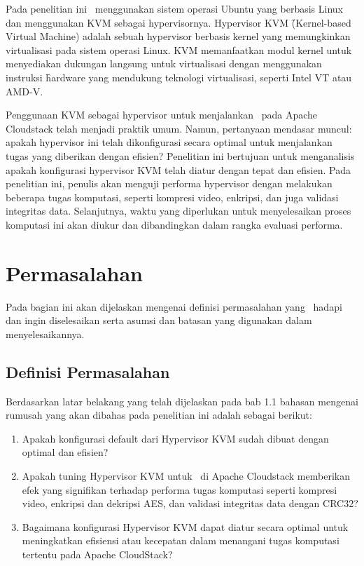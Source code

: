 Pada penelitian ini \saya\ menggunakan sistem operasi Ubuntu yang berbasis Linux dan menggunakan KVM sebagai hypervisornya. Hypervisor KVM \f{(Kernel-based Virtual Machine)} adalah sebuah hypervisor berbasis kernel yang memungkinkan virtualisasi pada sistem operasi Linux\cite{whatiskvm}. KVM memanfaatkan modul kernel untuk menyediakan dukungan langsung untuk virtualisasi dengan menggunakan instruksi \f{hardware} yang mendukung teknologi virtualisasi, seperti Intel VT atau AMD-V.

Penggunaan KVM sebagai hypervisor untuk menjalankan \vm\ pada Apache Cloudstack telah menjadi praktik umum. Namun, pertanyaan mendasar muncul: apakah hypervisor ini telah dikonfigurasi secara optimal untuk menjalankan tugas yang diberikan dengan efisien? Penelitian ini bertujuan untuk menganalisis apakah konfigurasi hypervisor KVM telah diatur dengan tepat dan efisien. Pada penelitian ini, penulis akan menguji performa hypervisor dengan melakukan beberapa tugas komputasi, seperti kompresi video, enkripsi, dan juga validasi integritas data. Selanjutnya, waktu yang diperlukan untuk menyelesaikan proses komputasi ini akan diukur dan dibandingkan dalam rangka evaluasi performa.


\section{Permasalahan}
Pada bagian ini akan dijelaskan mengenai definisi permasalahan yang \saya\ hadapi dan ingin diselesaikan serta asumsi dan batasan yang digunakan dalam menyelesaikannya.


\subsection{Definisi Permasalahan}
Berdasarkan latar belakang yang telah dijelaskan pada bab 1.1 bahasan mengenai rumusah yang akan dibahas pada penelitian ini adalah sebagai berikut:
\begin{enumerate}
      \item Apakah konfigurasi default dari Hypervisor KVM sudah dibuat dengan optimal dan efisien?
      \item Apakah tuning Hypervisor KVM untuk \vm\ di Apache Cloudstack memberikan efek yang signifikan terhadap performa tugas komputasi seperti kompresi video, enkripsi dan dekripsi AES, dan validasi integritas data dengan CRC32?
      \item Bagaimana konfigurasi Hypervisor KVM dapat diatur secara optimal untuk meningkatkan efisiensi atau kecepatan dalam menangani tugas komputasi tertentu pada Apache CloudStack?
\end{enumerate}


